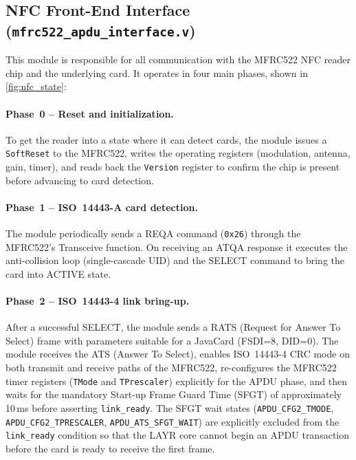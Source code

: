 \documentclass[manuscript,screen,nonacm]{acmart}
\begin{document}
\subsection{NFC Front-End Interface (\texttt{mfrc522\_apdu\_interface.v})}
\label{sec:impl:nfc}

This module is responsible for all communication with the MFRC522
NFC reader chip and the underlying card.
It operates in four main phases, shown in \cref{fig:nfc_state}:

\paragraph{Phase~0 – Reset and initialization.}
To get the reader into a state where it can detect cards,
the module issues a \texttt{SoftReset} to the MFRC522, writes the operating
registers (modulation, antenna, gain, timer), and reads back the \texttt{Version}
register to confirm the chip is present before advancing to card detection.


\paragraph{Phase~1 – ISO~14443-A card detection.}
The module periodically sends a REQA command (\texttt{0x26})
through the MFRC522's Transceive function.
On receiving an ATQA response it executes the anti-collision loop
(single-cascade UID) and the SELECT command to bring the card into
ACTIVE state.

\paragraph{Phase~2 – ISO~14443-4 link bring-up.}
After a successful SELECT, the module sends a RATS (Request for
Answer To Select) frame with parameters suitable for a JavaCard
(FSDI=8, DID=0).
The module receives the ATS (Answer To Select), enables ISO~14443-4
CRC mode on both transmit and receive paths of the MFRC522,
re-configures the MFRC522 timer registers (\texttt{TMode} and
\texttt{TPrescaler}) explicitly for the APDU phase,
and then waits for the mandatory Start-up Frame Guard Time (SFGT)
of approximately 10\,ms before asserting \texttt{link\_ready}.
The SFGT wait states (\texttt{APDU\_CFG2\_TMODE},
\texttt{APDU\_CFG2\_TPRESCALER}, \texttt{APDU\_ATS\_SFGT\_WAIT})
are explicitly excluded from the \texttt{link\_ready} condition
so that the LAYR core cannot begin an APDU transaction before the
card is ready to receive the first frame.
\end{document}
